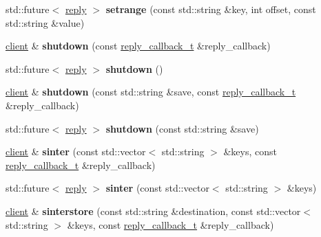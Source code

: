 \begin{DoxyCompactItemize}
std\+::future$<$ \hyperlink{classcpp__redis_1_1reply}{reply} $>$ {\bfseries setrange} (const std\+::string \&key, int offset, const std\+::string \&value)
\item 
\mbox{\label{classcpp__redis_1_1client_acdb7064ddc309b1dbc6681ae559cc189}} 
\hyperlink{classcpp__redis_1_1client}{client} \& {\bfseries shutdown} (const \hyperlink{classcpp__redis_1_1client_a061a1140d36d2eaeda82b09a0bb3f9f2}{reply\+\_\+callback\+\_\+t} \&reply\+\_\+callback)
\item 
\mbox{\label{classcpp__redis_1_1client_ae457a1b446eff2e264452eb35de72d37}} 
std\+::future$<$ \hyperlink{classcpp__redis_1_1reply}{reply} $>$ {\bfseries shutdown} ()
\item 
\mbox{\label{classcpp__redis_1_1client_aca186e9b705a566203a47e8b29f99a28}} 
\hyperlink{classcpp__redis_1_1client}{client} \& {\bfseries shutdown} (const std\+::string \&save, const \hyperlink{classcpp__redis_1_1client_a061a1140d36d2eaeda82b09a0bb3f9f2}{reply\+\_\+callback\+\_\+t} \&reply\+\_\+callback)
\item 
\mbox{\label{classcpp__redis_1_1client_a8587aeb1044e85ae580cd9661ea826dc}} 
std\+::future$<$ \hyperlink{classcpp__redis_1_1reply}{reply} $>$ {\bfseries shutdown} (const std\+::string \&save)
\item 
\mbox{\label{classcpp__redis_1_1client_a67a96ae85449a4dfa6e8976666562be1}} 
\hyperlink{classcpp__redis_1_1client}{client} \& {\bfseries sinter} (const std\+::vector$<$ std\+::string $>$ \&keys, const \hyperlink{classcpp__redis_1_1client_a061a1140d36d2eaeda82b09a0bb3f9f2}{reply\+\_\+callback\+\_\+t} \&reply\+\_\+callback)
\item 
\mbox{\label{classcpp__redis_1_1client_a069df07b6b3f18f5b2c215c67161c115}} 
std\+::future$<$ \hyperlink{classcpp__redis_1_1reply}{reply} $>$ {\bfseries sinter} (const std\+::vector$<$ std\+::string $>$ \&keys)
\item 
\mbox{\label{classcpp__redis_1_1client_a55f1722f17eaaa255196851efb0bdb93}} 
\hyperlink{classcpp__redis_1_1client}{client} \& {\bfseries sinterstore} (const std\+::string \&destination, const std\+::vector$<$ std\+::string $>$ \&keys, const \hyperlink{classcpp__redis_1_1client_a061a1140d36d2eaeda82b09a0bb3f9f2}{reply\+\_\+callback\+\_\+t} \&reply\+\_\+callback)

\end{DoxyCompactItemize}
